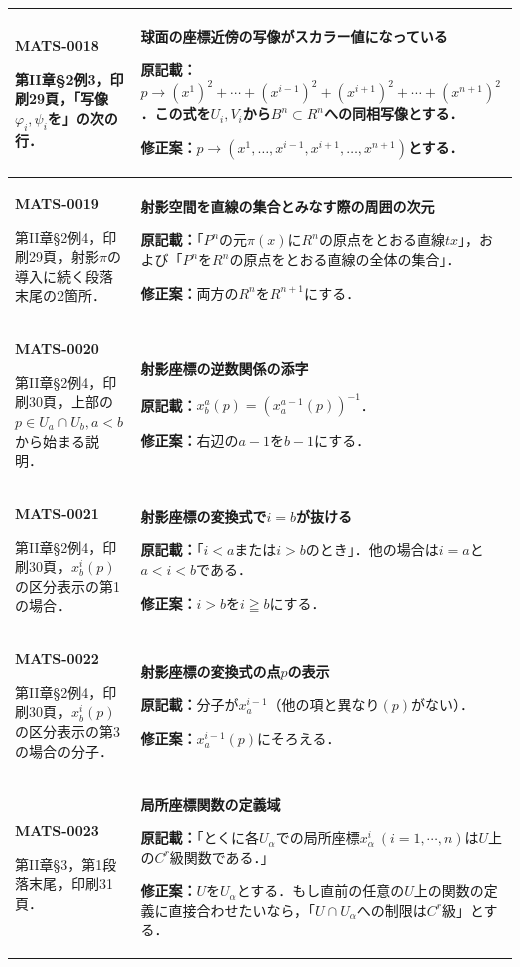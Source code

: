 \documentclass[a4paper,10pt]{ltjsarticle}
\begin{document}
\begin{longtable}{@{}>{\raggedright\arraybackslash}p{.19\linewidth}>{\raggedright\arraybackslash}p{.77\linewidth}@{}}
\hline
\hypertarget{MATS-0018}{}\textbf{MATS-0018}\par 第II章\S2例3，印刷29頁，「写像$\varphi_i,\psi_i$を」の次の行． & \textbf{球面の座標近傍の写像がスカラー値になっている}\par\textbf{原記載：}$p\to(x^1)^2+\cdots+(x^{i-1})^2+(x^{i+1})^2+\cdots+(x^{n+1})^2$．この式を$U_i,V_i$から$B^n\subset R^n$への同相写像とする．\par\textbf{修正案：}$p\to(x^1,\ldots,x^{i-1},x^{i+1},\ldots,x^{n+1})$とする． \\[3pt]
\hline
\hypertarget{MATS-0019}{}\textbf{MATS-0019}\par 第II章\S2例4，印刷29頁，射影$\pi$の導入に続く段落末尾の2箇所． & \textbf{射影空間を直線の集合とみなす際の周囲の次元}\par\textbf{原記載：}「$P^n$の元$\pi(x)$に$R^n$の原点をとおる直線$tx$」，および「$P^n$を$R^n$の原点をとおる直線の全体の集合」．\par\textbf{修正案：}両方の$R^n$を$R^{n+1}$にする． \\[3pt]
\hline
\hypertarget{MATS-0020}{}\textbf{MATS-0020}\par 第II章\S2例4，印刷30頁，上部の$p\in U_a\cap U_b,a<b$から始まる説明． & \textbf{射影座標の逆数関係の添字}\par\textbf{原記載：}$x_b^a(p)=(x_a^{a-1}(p))^{-1}$．\par\textbf{修正案：}右辺の$a-1$を$b-1$にする． \\[3pt]
\hline
\hypertarget{MATS-0021}{}\textbf{MATS-0021}\par 第II章\S2例4，印刷30頁，$x_b^i(p)$の区分表示の第1の場合． & \textbf{射影座標の変換式で$i=b$が抜ける}\par\textbf{原記載：}「$i<a$または$i>b$のとき」．他の場合は$i=a$と$a<i<b$である．\par\textbf{修正案：}$i>b$を$i\geqq b$にする． \\[3pt]
\hline
\hypertarget{MATS-0022}{}\textbf{MATS-0022}\par 第II章\S2例4，印刷30頁，$x_b^i(p)$の区分表示の第3の場合の分子． & \textbf{射影座標の変換式の点$p$の表示}\par\textbf{原記載：}分子が$x_a^{i-1}$（他の項と異なり$(p)$がない）．\par\textbf{修正案：}$x_a^{i-1}(p)$にそろえる． \\[3pt]
\hline
\hypertarget{MATS-0023}{}\textbf{MATS-0023}\par 第II章\S3，第1段落末尾，印刷31頁． & \textbf{局所座標関数の定義域}\par\textbf{原記載：}「とくに各$U_\alpha$での局所座標$x_\alpha^i\ (i=1,\cdots,n)$は$U$上の$C^r$級関数である．」\par\textbf{修正案：}$U$を$U_\alpha$とする．もし直前の任意の$U$上の関数の定義に直接合わせたいなら，「$U\cap U_\alpha$への制限は$C^r$級」とする． \\[3pt]

\end{longtable}
\end{document}
